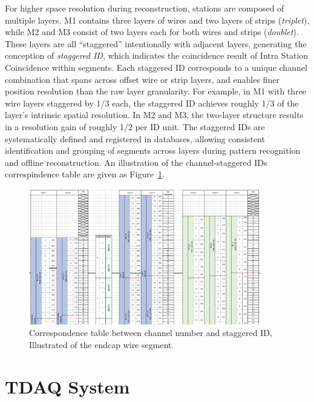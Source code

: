 For higher space resolution during reconstruction, stations are composed of multiple layers. M1 contains three layers of wires and two layers of strips (\textit{triplet}), while M2 and M3 consist of two layers each for both wires and strips (\textit{doublet}). These layers are all ``staggered'' intentionally with adjacent layers, generating the conception of \textit{staggered ID}, which indicates the coincidence result of Intra Station Coincidence within segments. Each staggered ID corresponds to a unique channel combination that spans across offset wire or strip layers, and enables finer position resolution than the raw layer granularity. For example, in M1 with three wire layers staggered by 1/3 each, the staggered ID achieves roughly 1/3 of the layer's intrinsic spatial resolution. In M2 and M3, the two-layer structure results in a resolution gain of roughly 1/2 per ID unit. The staggered IDs are systematically defined and registered in databases, allowing consistent identification and grouping of segments across layers during pattern recognition and offline reconstruction. An illustration of the channel-staggered IDs correspindence table are given as Figure~\ref{fig:staggeredID}.

\begin{figure}[htbp]
  \centering
  \includegraphics[width=0.9\textwidth]{figs/chapter2/staggeredID.png}
  \caption{Correspondence table between channel number and staggered ID, Illustrated of the endcap wire segment.}
  \label{fig:staggeredID}
\end{figure}

\section{TDAQ System} \label{sec:TDAQSystem}


